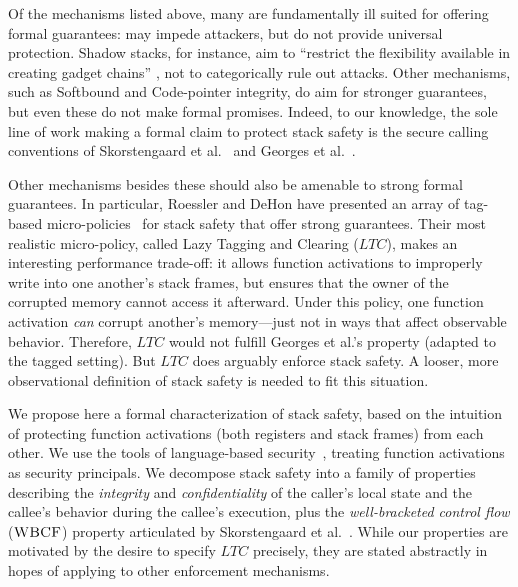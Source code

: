 \documentclass[10pt,conference]{ieeetran}%
\theoremstyle{definition}
\begin{document}
Of the mechanisms listed above, many are fundamentally ill suited for
offering formal guarantees: may impede attackers, but do not provide
universal protection. Shadow stacks, for instance, aim to ``restrict
the flexibility available in creating gadget chains''
\cite{Shanbhogue+19}, not to categorically rule out attacks. Other
mechanisms, such as Softbound\cite{NagarakatteZMZ09} and Code-pointer
integrity\cite{Kuznetsov+14}, do aim for stronger guarantees, but even
these do not make formal promises.  Indeed, to our knowledge, the sole
line of work making a formal claim to protect stack safety is the
secure calling conventions of Skorstengaard et
al.~\cite{SkorstengaardSTKJFP} and Georges et
al.~\cite{Georges22:TempsDesCerises}.

Other mechanisms besides these should also be amenable to strong
formal guarantees.  In particular, Roessler and DeHon
\cite{DBLP:conf/sp/RoesslerD18} have presented an array of tag-based
micro-policies~\cite{pump_oakland2015} for stack safety that offer
strong guarantees.  Their most realistic micro-policy, called Lazy
Tagging and Clearing (\(LTC\)), makes an interesting performance
trade-off: it allows function activations to improperly write into one
another's stack frames, but ensures that the owner of the corrupted
memory cannot access it afterward.
%
Under this policy, one function activation {\em can} corrupt another's
memory---just not in ways that affect observable behavior.
Therefore, \(LTC\) would not fulfill Georges et al.'s property
(adapted to the tagged setting).  But \(LTC\) does
arguably enforce stack safety.  A looser, more observational
definition of stack safety is needed to fit this situation.

We propose here a formal characterization of stack safety, based on
the intuition of protecting function activations (both registers and
stack frames) from each other.
We use the tools of language-based
security~\cite{sabelfeld2003language}, treating function activations as
security principals.  We decompose stack safety into a family of
properties describing
the {\em integrity} and {\em confidentiality} of the caller’s local state
and the callee's behavior during the callee's execution, plus the
{\em well-bracketed control flow} (\(\textnormal{\sc WBCF}\)) property articulated by
Skorstengaard et al.~\cite{SkorstengaardSTKJFP}.
While our properties are motivated by the desire to specify \(LTC\) precisely,
they are stated abstractly in hopes of applying
to other enforcement mechanisms.
\end{document}
